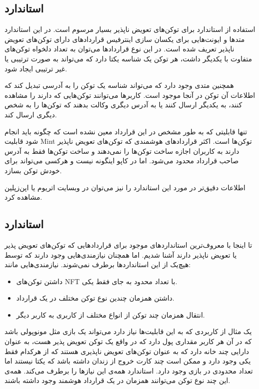 \subsection{استاندارد }
استفاده از استاندارد
برای توکن‌های تعویض ناپذیر بسیار مرسوم است. در این استاندارد متدها و ایونت‌هایی برای یکسان سازی اینترفیس قراردادهای دارای توکن‌های تعویض ناپذیر تعریف شده است. در این نوع قرارداد‌ها می‌توان به تعداد دلخواه توکن‌های متفاوت با یکدیگر داشت، هر توکن یک شناسه یکتا دارد که می‌تواند به صورت ترتیبی یا غیر ترتیبی ایجاد شود.

همچنین متدی وجود دارد که می‌تواند شناسه یک توکن را به آدرسی تبدیل کند که اطلاعات آن توکن در آنجا موجود است. کاربرها می‌توانند توکن‌هایی که دارند را مشاهده کنند، به یکدیگر ارسال کنند یا به آدرس دیگری وکالت بدهند که توکن‌ها را به شخص دیگری ارسال کند.

تنها قابلیتی که به طور مشخص در این قرارداد معین نشده است که چگونه باید انجام شود قابلیت
\gls{Mint}
توکن‌ها است. اکثر قراردادهای هوشمندی که توکن‌های تعویض ناپذیر دارند به کاربران اجازه ساخت توکن‌ها را نمی‌دهند و ساخت توکن‌ها فقط به آدرس صاحب قرارداد محدود می‌شود. اما در کاپو اینگونه نیست و هرکسی می‌تواند برای خودش توکن بسازد.

اطلاعات دقیق‌تر در مورد این استاندارد را نیز می‌توان در وبسایت
اتریوم
یا
اپن‌زپلین
مشاهده کرد.


\subsection{استاندارد }
تا اینجا با معروف‌ترین استاندارد‌های موجود برای قراردادهایی که توکن‌های تعویض پذیر یا تعویض ناپذیر دارند آشنا شدیم. اما همچنان نیازمندی‌هایی وجود دارند که توسط هیچ‌یک از این استانداردها برطرف نمی‌شوند. نیازمندی‌هایی مانند:
\begin{itemize}
	\item
داشتن توکن‌های NFT با تعداد محدود به جای فقط یکی.
	\item
داشتن همزمان چندین نوع توکن مختلف در یک قرارداد.
	\item
انتقال همزمان چند توکن از انواع مختلف از کاربری به کاربر دیگر.
\end{itemize}

یک مثال از کاربردی که به این قابلیت‌ها نیاز دارد می‌تواند یک بازی مثل مونوپولی باشد که در آن هر کاربر مقداری پول دارد که در واقع یک توکن تعویض پذیر هست، به عنوان دارایی چند خانه دارد که به عنوان توکن‌های تعویض ناپذیری هستند که از هرکدام فقط یکی وجود دارد و ممکن است چند کارت خروج از زندان داشته باشد که یکتا نیستند اما تعداد محدودی در بازی وجود دارد. استاندارد
همه‌ی این نیازها را برطرف می‌کند. همه‌ی این چند نوع توکن می‌توانند همزمان در یک قرارداد هوشمند وجود داشته باشند.

